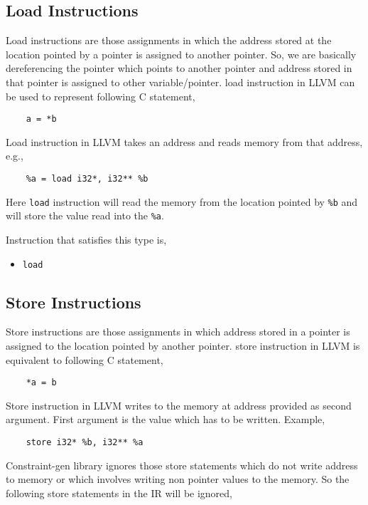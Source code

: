 \documentclass[a4paper,11pt]{report}
\begin{document}
\subsection{Load Instructions}
Load instructions are those assignments in which the address stored at the 
location pointed by a pointer is assigned to another pointer. So, we are 
basically dereferencing the pointer which points to another pointer and address 
stored in that pointer is assigned to other variable/pointer.
load instruction in LLVM can be used to represent following C statement,
\begin{lstlisting}
    a = *b
\end{lstlisting}

\noindent
Load instruction in LLVM takes an address and reads memory from that address,
e.g.,

\begin{verbatim}
    %a = load i32*, i32** %b
\end{verbatim}

\noindent
Here \texttt{load} instruction will read the memory from the location pointed 
by \texttt{\%b} and will store the value read into the \texttt{\%a}.

\noindent
Instruction that satisfies this type is,
\begin{itemize}
 \item \texttt{load}
\end{itemize}


\subsection{Store Instructions}
Store instructions are those assignments in which address stored in a pointer 
is assigned to the location pointed by another pointer.
store instruction in LLVM is equivalent to following C statement,
\begin{lstlisting}
    *a = b
\end{lstlisting}

\noindent
Store instruction in LLVM writes to the memory at address provided as second
argument. First argument is the value which has to be written.
Example,
\begin{verbatim}
    store i32* %b, i32** %a
\end{verbatim}

\noindent
Constraint-gen library ignores those store statements which do not write address
to memory or which involves writing non pointer values to the memory. So the
following store statements in the IR will be ignored,
\end{document}

